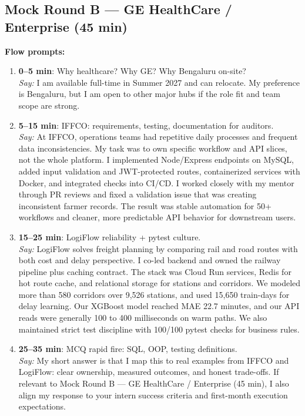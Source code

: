 \documentclass[9pt,a4paper]{article}
\begin{document}
\subsection{Mock Round B --- GE HealthCare / Enterprise (45 min)}
\textbf{Flow prompts:}
\begin{enumerate}
  \item \textbf{0--5 min}: Why healthcare? Why GE? Why Bengaluru on-site?\\
  \textit{Say:} I am available full-time in Summer 2027 and can relocate. My preference is Bengaluru, but I am open to other major hubs if the role fit and team scope are strong.
  \item \textbf{5--15 min}: IFFCO: requirements, testing, documentation for auditors.\\
  \textit{Say:} At IFFCO, operations teams had repetitive daily processes and frequent data inconsistencies. My task was to own specific workflow and API slices, not the whole platform. I implemented Node/Express endpoints on MySQL, added input validation and JWT-protected routes, containerized services with Docker, and integrated checks into CI/CD. I worked closely with my mentor through PR reviews and fixed a validation issue that was creating inconsistent farmer records. The result was stable automation for 50+ workflows and cleaner, more predictable API behavior for downstream users.
  \item \textbf{15--25 min}: LogiFlow reliability + pytest culture.\\
  \textit{Say:} LogiFlow solves freight planning by comparing rail and road routes with both cost and delay perspective. I co-led backend and owned the railway pipeline plus caching contract. The stack was Cloud Run services, Redis for hot route cache, and relational storage for stations and corridors. We modeled more than 580 corridors over 9,526 stations, and used 15,650 train-days for delay learning. Our XGBoost model reached MAE 22.7 minutes, and our API reads were generally 100 to 400 milliseconds on warm paths. We also maintained strict test discipline with 100/100 pytest checks for business rules.
  \item \textbf{25--35 min}: MCQ rapid fire: SQL, OOP, testing definitions.\\
  \textit{Say:} My short answer is that I map this to real examples from IFFCO and LogiFlow: clear ownership, measured outcomes, and honest trade-offs. If relevant to Mock Round B --- GE HealthCare / Enterprise (45 min), I also align my response to your intern success criteria and first-month execution expectations.

\end{enumerate}
\end{document}

